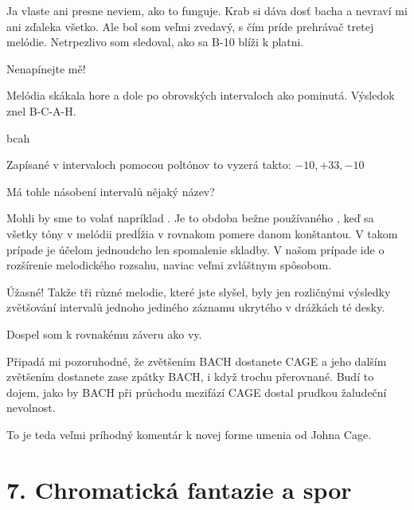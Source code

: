 \documentclass[12pt]{article}
\begin{document}
\begin{description}[itemsep=0pt]
\item[Ž:] Ja vlaste ani presne neviem, ako to funguje. Krab si dáva dosť bacha 
    a nevraví mi ani zďaleka všetko. Ale bol som veľmi zvedavý, s čím príde 
    prehrávač tretej melódie. Netrpezlivo som sledoval, ako sa B-10 blíži k platni.

\item[A:] Nenapínejte mě!

\item[Ž:] Melódia skákala hore a dole po obrovských intervaloch ako pominutá. 
    Výsledok znel B-C-A-H.

\item[melodia] bcah

\item[Ž:] Zapísané v intervaloch pomocou poltónov to vyzerá takto: $-10, +33, -10$

\item[A:] Má tohle násobení intervalů nějaký název?

\item[Ž:] Mohli by sme to volať napríklad . Je to obdoba 
    bežne používaného , keď sa všetky tóny v melódii predĺžia 
    v rovnakom pomere danom konštantou. V takom prípade je účelom jednoudcho len 
    spomalenie skladby. V našom prípade ide o rozšírenie melodického rozsahu, naviac 
    veľmi zvláštnym spôsobom.

\item[A:] Úžasné! Takže tři různé melodie, které jste slyšel, byly jen rozličnými
    výsledky zvětšování intervalů jednoho jediného záznamu ukrytého v drážkách té desky.

\item[Ž:] Dospel som k rovnakému záveru ako vy.

\item[A:] Připadá mi pozoruhodné, že zvětšením BACH dostanete CAGE a jeho dalším
    zvětšením dostanete zase zpátky BACH, i když trochu přerovnané.
    Budí to dojem, jako by BACH při průchodu mezifází CAGE dostal prudkou žaludeční
    nevolnost.

\item[Ž:] To je teda veľmi príhodný komentár k novej forme umenia od Johna Cage.

\end{description}

\newpage
\section*{7. Chromatická fantazie a spor}
\end{document}
